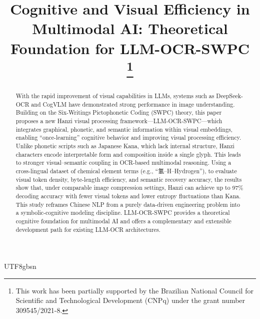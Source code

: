 \documentclass[conference]{IEEEtran}
\begin{document}
\begin{CJK*}{UTF8}{gbsn}%

\title{Cognitive and Visual Efficiency in Multimodal AI:
Theoretical Foundation for LLM-OCR-SWPC\\


\thanks{This work has been partially supported by the Brazilian National Council for Scientific and Technological Development (CNPq) under the grant number 309545/2021-8.
}
}

\author{
\and



}

\maketitle

\begin{abstract}
With the rapid improvement of visual capabilities in LLMs, systems such as DeepSeek-OCR and CogVLM have demonstrated strong performance in image understanding. Building on the Six-Writings Pictophonetic Coding (SWPC) theory, this paper proposes a new Hanzi visual processing framework—LLM-OCR-SWPC—which integrates graphical, phonetic, and semantic information within visual embeddings, enabling “once-learning” cognitive behavior and improving visual processing efficiency.
Unlike phonetic scripts such as Japanese Kana, which lack internal structure, Hanzi characters encode interpretable form and composition inside a single glyph. This leads to stronger visual–semantic coupling in OCR-based multimodal reasoning. Using a cross-lingual dataset of chemical element terms (e.g., “氢–H–Hydrogen”), to evaluate visual token density, byte-length efficiency, and semantic recovery accuracy, the results show that, under comparable image compression settings, Hanzi can achieve up to 97\% decoding accuracy with fewer visual tokens and lower entropy fluctuations than Kana.
This study reframes Chinese NLP from a purely data-driven engineering problem into a symbolic-cognitive modeling discipline. LLM-OCR-SWPC provides a theoretical cognitive foundation for multimodal AI and offers a complementary and extensible development path for existing LLM-OCR architectures.


\end{abstract}
\end{CJK*}
\end{document}
